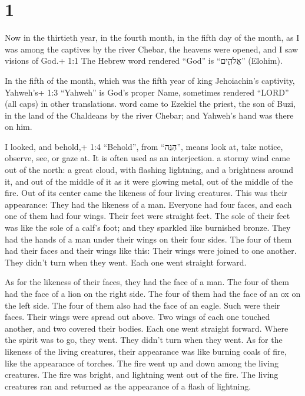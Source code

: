 \hypertarget{section}{%
\section{1}\label{section}}

 Now in the thirtieth year, in the fourth month, in the
fifth day of the month, as I was among the captives by the river Chebar,
the heavens were opened, and I saw visions of God.+ 1:1 The Hebrew word
rendered ``God'' is ``אֱלֹהִ֑ים'' (Elohim).

 In the fifth of the month, which was the fifth year of king
Jehoiachin's captivity,  Yahweh's+ 1:3 ``Yahweh'' is God's
proper Name, sometimes rendered ``LORD'' (all caps) in other
translations. word came to Ezekiel the priest, the son of Buzi, in the
land of the Chaldeans by the river Chebar; and Yahweh's hand was there
on him.

 I looked, and behold,+ 1:4 ``Behold'', from ``הִנֵּה'',
means look at, take notice, observe, see, or gaze at. It is often used
as an interjection. a stormy wind came out of the north: a great cloud,
with flashing lightning, and a brightness around it, and out of the
middle of it as it were glowing metal, out of the middle of the fire.
 Out of its center came the likeness of four living
creatures. This was their appearance: They had the likeness of a man.
 Everyone had four faces, and each one of them had four
wings.  Their feet were straight feet. The sole of their
feet was like the sole of a calf's foot; and they sparkled like
burnished bronze.  They had the hands of a man under their
wings on their four sides. The four of them had their faces and their
wings like this:  Their wings were joined to one another.
They didn't turn when they went. Each one went straight forward.

 As for the likeness of their faces, they had the face of a
man. The four of them had the face of a lion on the right side. The four
of them had the face of an ox on the left side. The four of them also
had the face of an eagle.  Such were their faces. Their
wings were spread out above. Two wings of each one touched another, and
two covered their bodies.  Each one went straight forward.
Where the spirit was to go, they went. They didn't turn when they went.
 As for the likeness of the living creatures, their
appearance was like burning coals of fire, like the appearance of
torches. The fire went up and down among the living creatures. The fire
was bright, and lightning went out of the fire.  The living
creatures ran and returned as the appearance of a flash of lightning.

